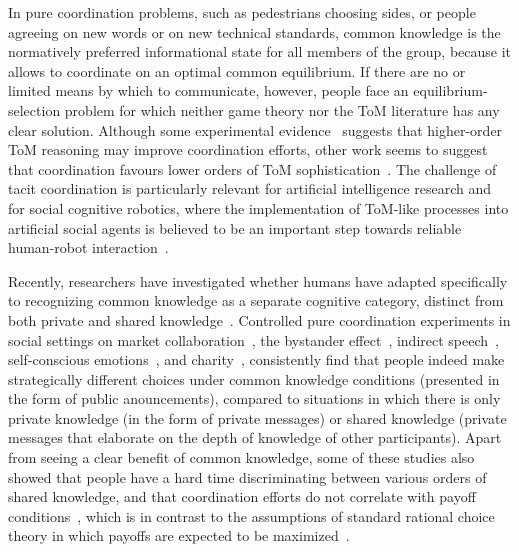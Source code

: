 \documentclass[twocolumn,a4paper,superscriptaddress,nofootinbib]{revtex4}
\begin{document}
In pure coordination problems, such as pedestrians choosing sides, or people agreeing on new words or on new technical standards, common knowledge is the normatively preferred informational state for all members of the group, because it allows to coordinate on an optimal common equilibrium. If there are no or limited means by which to communicate, however, people face an equilibrium-selection problem for which neither game theory nor the ToM literature has any clear solution. Although some experimental evidence~\citep{curry2012putting} suggests that higher-order ToM reasoning may improve coordination efforts, other work seems to suggest that coordination favours lower orders of ToM sophistication~\citep{ devaine2014theory, de2015higher}. The challenge of tacit coordination is particularly relevant for artificial intelligence research and for social cognitive robotics, where the implementation of ToM-like processes into artificial social agents is believed to be an important step towards reliable human-robot interaction~\citep{erb2016artificial, bolander2018seeing, bard2020hanabi, dissing2020implementing}.

Recently, researchers have investigated whether humans have adapted specifically to recognizing common knowledge as a separate cognitive category, distinct from both private and shared knowledge~\citep{de2019common}. Controlled pure coordination experiments in social settings on market collaboration~\citep{thomas2014psychology}, the bystander effect~\citep{thomas2016recursive}, indirect speech~\citep{lee2010rationales}, self-conscious emotions~\citep{thomas2018common}, and charity~\citep{de2019maimonides}, consistently find that people indeed make strategically different choices under common knowledge conditions (presented in the form of public anouncements), compared to situations in which there is only private knowledge (in the form of private messages) or shared knowledge (private messages that elaborate on the depth of knowledge of other participants). Apart from seeing a clear benefit of common knowledge, some of these studies also showed that people have a hard time discriminating between various orders of shared knowledge, and that coordination efforts do not correlate with payoff conditions~\citep{thomas2014psychology}, which is in contrast to the assumptions of standard rational choice theory in which payoffs are expected to be maximized~\citep{becker1976economic}.
\end{document}
